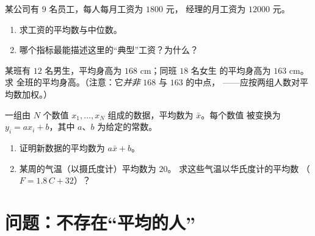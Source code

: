 \begin{exercise}[$\star\star$]\label{exo:g10:stats:7}
某公司有 $9$ 名员工，每人每月工资为 $1800$ 元，
经理的月工资为 $12000$ 元。
\begin{enumerate}
  \item 求工资的平均数与中位数。
  \item 哪个指标最能描述这里的“典型”工资？为什么？
\end{enumerate}
\end{exercise}

\begin{exercise}[$\star\star$]\label{exo:g10:stats:8}
某班有 $12$ 名男生，平均身高为 $168$ cm；同班 $18$ 名女生
的平均身高为 $163$ cm。求
全班的平均身高。（注意：它\emph{并非} $168$ 与 $163$ 的中点，
——应按两组人数对平均数加权。）
\end{exercise}

\begin{exercise}[$\star\star\star$]\label{exo:g10:stats:9}
一组由 $N$ 个数值 $x_1, \dots, x_N$ 组成的数据，平均数为 $\bar x$。每个数值
被变换为 $y_i = a x_i + b$，其中 $a$、$b$ 为给定的常数。
\begin{enumerate}
  \item 证明新数据的平均数为 $a \bar x + b$。
  \item 某周的气温（以摄氏度计）平均数为 $20$。
        求这些气温以华氏度计的平均数
        （$F = 1.8\,C + 32$）？
\end{enumerate}
\end{exercise}

\section{问题：不存在“平均的人”}

